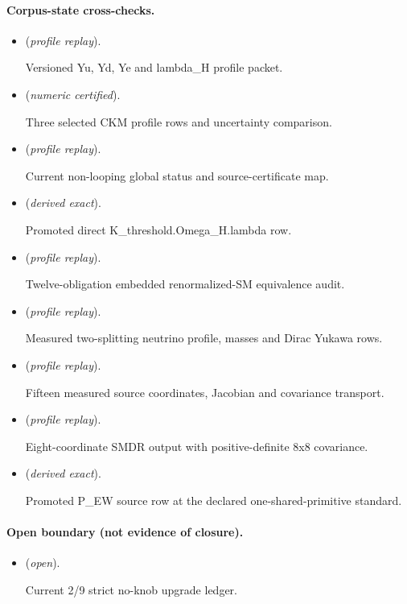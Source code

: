 \documentclass[11pt]{article}
\begin{document}
\paragraph{Corpus-state cross-checks.}
\begin{itemize}
\setlength{\itemsep}{0.25em}
\item {} (\emph{profile replay}).\par Versioned Yu, Yd, Ye and lambda\_H profile packet.
\item {} (\emph{numeric certified}).\par Three selected CKM profile rows and uncertainty comparison.
\item {} (\emph{profile replay}).\par Current non-looping global status and source-certificate map.
\item {} (\emph{derived exact}).\par Promoted direct K\_threshold.Omega\_H.lambda row.
\item {} (\emph{profile replay}).\par Twelve-obligation embedded renormalized-SM equivalence audit.
\item {} (\emph{profile replay}).\par Measured two-splitting neutrino profile, masses and Dirac Yukawa rows.
\item {} (\emph{profile replay}).\par Fifteen measured source coordinates, Jacobian and covariance transport.
\item {} (\emph{profile replay}).\par Eight-coordinate SMDR output with positive-definite 8x8 covariance.
\item {} (\emph{derived exact}).\par Promoted P\_EW source row at the declared one-shared-primitive standard.
\end{itemize}

\paragraph{Open boundary (not evidence of closure).}
\begin{itemize}
\setlength{\itemsep}{0.25em}
\item {} (\emph{open}).\par Current 2/9 strict no-knob upgrade ledger.
\end{itemize}
\end{document}
